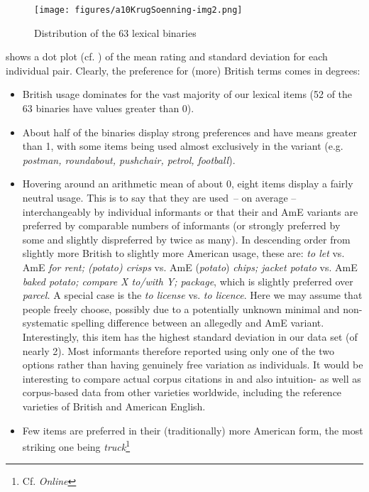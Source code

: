 \documentclass[output=paper]{langsci/langscibook}
\begin{document}
\begin{figure}
\texttt{[image: figures/a10KrugSoenning-img2.png]}
\caption{Distribution of the 63 lexical binaries}
\label{fig:krug:2}
\end{figure}

 shows a dot plot (cf. \citealt{Soenning2016}) of the mean rating and standard deviation for each individual pair. Clearly, the preference for (more) British terms comes in degrees:

\begin{itemize}
\item British usage dominates for the vast majority of our lexical items (52 of the 63 binaries have values greater than 0). 
\item About half of the binaries display strong  preferences and have means greater than 1, with some items being used almost exclusively in the  variant (e.g. \textit{postman, roundabout, pushchair, petrol, football}).
\item Hovering around an arithmetic mean of about 0, eight items display a fairly neutral usage. This is to say that they are used~– on average – interchangeably by individual informants or that their  and AmE variants are preferred by comparable numbers of informants (or strongly preferred by some and slightly dispreferred by twice as many). In descending order from slightly more British to slightly more American usage, these are: \textit{to let} vs. AmE \textit{for rent; (potato) crisps} vs. AmE (\textit{potato}) \textit{chips; jacket potato} vs. AmE \textit{baked potato; compare X to/with Y; package}, which is slightly preferred over  \textit{parcel.} A special case is the  \textit{to license} vs. \textit{to licence}. Here we may assume that people freely choose, possibly due to a potentially unknown minimal and non-systematic spelling difference between an allegedly  and AmE variant. Interestingly, this item has the highest standard deviation in our data set (of nearly 2). Most informants therefore reported using only one of the two options rather than having genuinely free variation as individuals. It would be interesting to compare actual corpus citations in  and also intuition- as well as corpus-based data from other varieties worldwide, including the reference varieties of British and American English. 
\item Few items are preferred in their (traditionally) more American
  form, the most striking one being
  \textit{truck}\footnote{Cf. \citealt{oed} \textit{Online}
}
\end{itemize}
\end{document}
